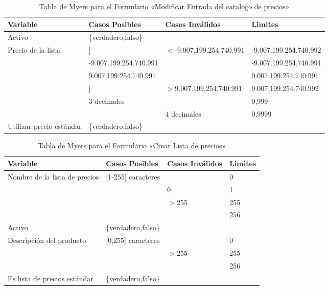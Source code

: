 \begin{table}[H]
\centering
\begin{tabular}{|p{3.0cm}|p{4.0cm}|p{4.0cm}|l|}
\hline
\footnotesize{\textbf{Variable}} & \footnotesize{\textbf{Casos Posibles}} & \footnotesize{\textbf{Casos Inválidos}} & \footnotesize{\textbf{Limites}} \\
\hline
\footnotesize{Activo} & \footnotesize{\{verdadero,falso\}} & & \\
\hline
\footnotesize{Precio de la lista} & \footnotesize{[} & \footnotesize{$<$-9.007.199.254.740.991} & \footnotesize{-9.007.199.254.740.992} \\
& \footnotesize{-9.007.199.254.740.991} & & \footnotesize{-9.007.199.254.740.991} \\
& \footnotesize{9.007.199.254.740.991} & & \footnotesize{9.007.199.254.740.991} \\
& \footnotesize{]} & \footnotesize{$>$9.007.199.254.740.991} & \footnotesize{9.007.199.254.740.992} \\
& \footnotesize{3 decimales} & & \footnotesize{0,999} \\
& & \footnotesize{4 decimales} & \footnotesize{0,9999} \\
\hline
\footnotesize{Utilizar precio estándar} & \footnotesize{\{verdadero,falso\}} & & \\
\hline
\end{tabular}
\caption{Tabla de Myers para el Formulario «Modificar Entrada del catalogo de precios»}
\label{myers_04}
\end{table}

\begin{table}[H]
\centering
\begin{tabular}{|p{6.0cm}|l|l|l|}
\hline
\footnotesize{\textbf{Variable}} & \footnotesize{\textbf{Casos Posibles}} & \footnotesize{\textbf{Casos Inválidos}} & \footnotesize{\textbf{Limites}} \\
\hline
\footnotesize{Nombre de la lista de precios} & \footnotesize{[1-255] caracteres} & & \footnotesize{0} \\
& & \footnotesize{0} & \footnotesize{1} \\
& & \footnotesize{$>$255} & \footnotesize{255} \\
& & & \footnotesize{256} \\
\hline
\footnotesize{Activo} & \footnotesize{\{verdadero,falso\}} & & \\
\hline
\footnotesize{Descripción del producto} & \footnotesize{[0,255] caracteres} & & \footnotesize{0} \\
& & \footnotesize{$>$255} & \footnotesize{255} \\
& & & \footnotesize{256} \\
\hline
\footnotesize{Es lista de precios estándar} & \footnotesize{\{verdadero,falso\}} & & \\
\hline
\end{tabular}
\caption{Tabla de Myers para el Formulario «Crear Lista de precios»}
\label{myers_05}
\end{table}

